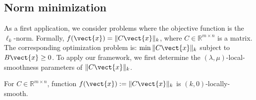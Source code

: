 
\subsection{Norm minimization} \label{appix-norm}

As a first application, we consider problems where the objective function is the $\ell_{k}$-norm. Formally,  $f(\vect{x}) = \|C \vect{x}\|_{k}$, where $C \in \mathbb{R}^{m \times n}$ is a matrix. The corresponding optimization problem is: $\min \|C \vect{x}\|_{k}$ subject to $B \vect{x} \geq 0$. To apply our framework, we first determine the $(\lambda, \mu)$-local-smoothness parameters of $\|C \vect{x}\|_{k}$.

\begin{lemma} \label{lem-makespan}
For $C \in \mathbb{R}^{m \times n}$, function $f(\vect{x}) := \|C \vect{x}\|_{k}$ is $(k,0)$-locally-smooth.
\end{lemma}
%
